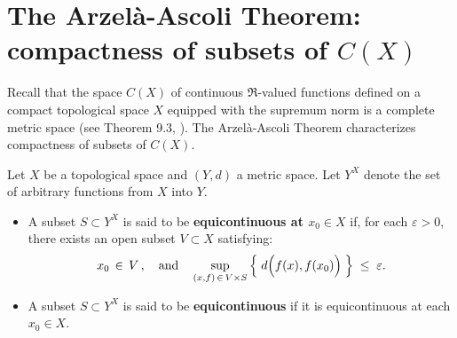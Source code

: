 

\section{The Arzel\`{a}-Ascoli Theorem: compactness of subsets of $C(X)$}
\setcounter{theorem}{0}
\setcounter{equation}{0}

\renewcommand{\theenumi}{\roman{enumi}}
\renewcommand{\labelenumi}{\textnormal{(\theenumi)}$\;\;$}

Recall that the space $C(X)$ of continuous $\Re$-valued functions defined
on a compact topological space $X$ equipped with the supremum norm
is a complete metric space (see Theorem 9.3, \cite{Aliprantis1998}).
The Arzel\`{a}-Ascoli Theorem characterizes compactness of subsets of $C(X)$.

\begin{definition}[Equicontinuity]
\mbox{}\vskip 0.1cm
\noindent
Let $X$ be a topological space and $(Y,d)$ a metric space.
Let $Y^{X}$ denote the set of arbitrary functions from $X$ into $Y$.
\begin{itemize}
\item	A subset $S \subset Y^{X}$ is said to be \textbf{equicontinuous at $x_{0} \in X$} if,
		for each $\varepsilon > 0$, there exists an open subset $V \subset X$ satisfying:
		\begin{equation*}
		x_{0} \,\in\, V\,,
		\quad\textnormal{and}\quad
		\sup_{(x,f) \,\in\, V \times S}\left\{\;d\!\left(\overset{{\color{white}.}}{f}(x),f(x_{0})\right)\;\right\}
		\;\leq\; \varepsilon.
		\end{equation*}
\item	A subset $S \subset Y^{X}$ is said to be \textbf{equicontinuous} if it is equicontinuous at each $x_{0} \in X$.
\end{itemize}
\end{definition}

